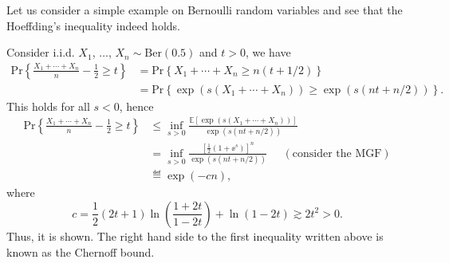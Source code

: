 Let us consider a simple example on Bernoulli random variables and see that the Hoeffding's inequality indeed holds.
\begin{example}
    Consider i.i.d. $X_1$, $\ldots$, $X_n\sim\mathrm{Ber}(0.5)$ and $t>0$, we have
    \begin{align*}
        \mathrm{Pr}\left\{\frac{X_1+\cdots+X_n}{n} - \frac{1}{2} \ge t\right\} &= \mathrm{Pr}\left\{X_1+\cdots+X_n \ge n\left(t+1/2\right)\right\} \\
        &= \mathrm{Pr}\left\{\exp\left(s(X_1+\cdots+X_n)\right) \ge \exp\left(s\left(nt+n/2\right)\right)\right\}.
    \end{align*}
    This holds for all $s<0$, hence
    \begin{align*}
         \mathrm{Pr}\left\{\frac{X_1+\cdots+X_n}{n} - \frac{1}{2} \ge t\right\} &\le \inf_{s>0} \frac{\mathbb{E}\left[\exp\left(s(X_1+\cdots+X_n)\right)\right]}{\exp\left(s(nt+n/2)\right)} \\
        &= \inf_{s>0} \frac{\left[\frac{1}{2}(1+\ee^s)\right]^n}{\exp\left(s(nt+n/2)\right)}\;\;\;\;\;(\text{consider the MGF}) \\
        &\eqdef \exp(-cn),
    \end{align*}
    where
    \begin{equation*}
        c = \frac{1}{2}(2t+1)\ln\left(\frac{1+2t}{1-2t}\right) + \ln\left(1-2t\right) \gtrsim 2t^2 > 0.
    \end{equation*}
    Thus, it is shown. The right hand side to the first inequality written above is known as the Chernoff bound.
\end{example}


